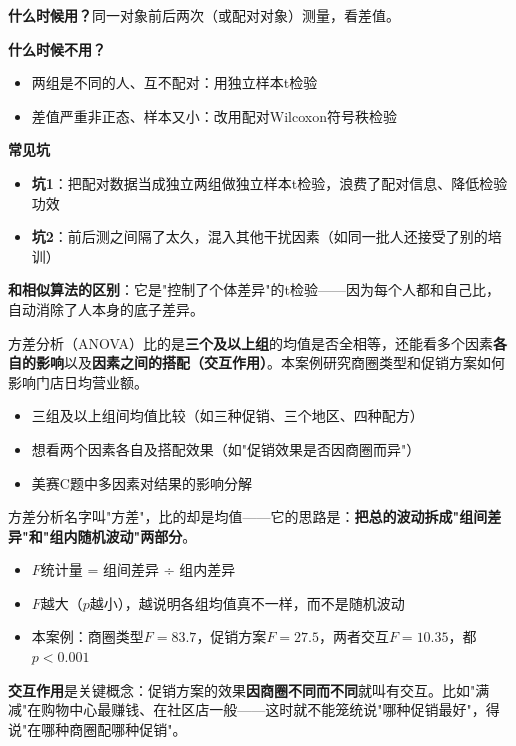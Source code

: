\begin{algonotes}
\textbf{什么时候用？}同一对象前后两次（或配对对象）测量，看差值。

\textbf{什么时候不用？}
\begin{itemize}
    \item 两组是不同的人、互不配对：用独立样本t检验
    \item 差值严重非正态、样本又小：改用配对Wilcoxon符号秩检验
\end{itemize}

\textbf{常见坑}
\begin{itemize}
    \item \textbf{坑1}：把配对数据当成独立两组做独立样本t检验，浪费了配对信息、降低检验功效
    \item \textbf{坑2}：前后测之间隔了太久，混入其他干扰因素（如同一批人还接受了别的培训）
\end{itemize}

\textbf{和相似算法的区别}：它是"控制了个体差异"的t检验——因为每个人都和自己比，自动消除了人本身的底子差异。
\end{algonotes}


\begin{algointro}
方差分析（ANOVA）比的是\textbf{三个及以上组}的均值是否全相等，还能看多个因素\textbf{各自的影响}以及\textbf{因素之间的搭配（交互作用）}。本案例研究商圈类型和促销方案如何影响门店日均营业额。
\end{algointro}

\begin{algoscene}
\begin{itemize}
    \item 三组及以上组间均值比较（如三种促销、三个地区、四种配方）
    \item 想看两个因素各自及搭配效果（如"促销效果是否因商圈而异"）
    \item 美赛C题中多因素对结果的影响分解
\end{itemize}
\end{algoscene}

\begin{algoprinciple}
方差分析名字叫"方差"，比的却是均值——它的思路是：\textbf{把总的波动拆成"组间差异"和"组内随机波动"两部分}。

\begin{itemize}
    \item $F$统计量 = 组间差异 ÷ 组内差异
    \item $F$越大（$p$越小），越说明各组均值真不一样，而不是随机波动
    \item 本案例：商圈类型$F=83.7$，促销方案$F=27.5$，两者交互$F=10.35$，都$p<0.001$
\end{itemize}

\textbf{交互作用}是关键概念：促销方案的效果\textbf{因商圈不同而不同}就叫有交互。比如"满减"在购物中心最赚钱、在社区店一般——这时就不能笼统说"哪种促销最好"，得说"在哪种商圈配哪种促销"。
\end{algoprinciple}

